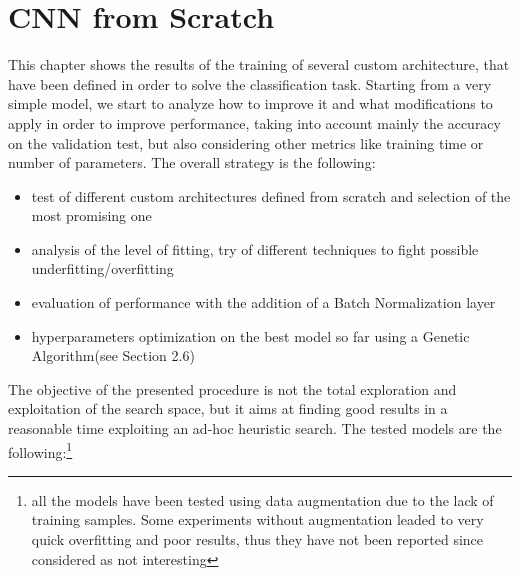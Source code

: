 \section{CNN from Scratch}
This chapter shows the results of the training of several custom architecture, that have been defined in order to solve the classification task.
Starting from a very simple model, we start to analyze how to improve it and what modifications to apply in order to improve performance, taking into account mainly the accuracy on the validation test, but also considering other metrics like training time or number of parameters.
The overall strategy is the following:
\begin{itemize}
\item test of different custom architectures defined from scratch and selection of the most promising one
\item analysis of the level of fitting, try of different techniques to fight possible underfitting/overfitting
\item evaluation of performance with the addition of a Batch Normalization layer
\item hyperparameters optimization on the best model so far using a Genetic Algorithm(see Section 2.6)
\end{itemize}

The objective of the presented procedure is not the total exploration and exploitation of the search space, but it aims at finding good results in a reasonable time exploiting an ad-hoc heuristic search.
The tested models are the following:\footnote{all the models have been tested using data augmentation due to the lack of training samples. Some experiments without augmentation leaded to very quick overfitting and poor results, thus they have not been reported since considered as not interesting}

